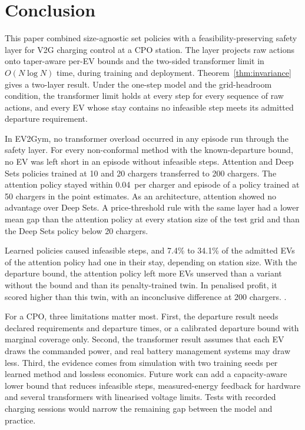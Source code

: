 \section{Conclusion}\label{sec:conclusion}

This paper combined size-agnostic set policies with a feasibility-preserving safety layer for V2G charging control at a CPO station.
The layer projects raw actions onto taper-aware per-EV bounds and the two-sided transformer limit in $O(N\log N)$ time, during training and deployment.
Theorem~\ref{thm:invariance} gives a two-layer result.
Under the one-step model and the grid-headroom condition, the transformer limit holds at every step for every sequence of raw actions, and every EV whose stay contains no infeasible step meets its admitted departure requirement.

In EV2Gym, no transformer overload occurred in any episode run through the safety layer.
For every non-conformal method with the known-departure bound, no EV was left short in an episode without infeasible steps.
Attention and Deep Sets policies trained at 10 and 20 chargers transferred to 200 chargers.
The attention policy stayed within 0.04\,\texteuro{} per charger and episode of a policy trained at 50 chargers in the point estimates.
As an architecture, attention showed no advantage over Deep Sets.
A price-threshold rule with the same layer had a lower mean gap than the attention policy at every station size of the test grid and than the Deep Sets policy below 20 chargers.

Learned policies caused infeasible steps, and 7.4\% to 34.1\% of the admitted EVs of the attention policy had one in their stay, depending on station size.
With the departure bound, the attention policy left more EVs unserved than a variant without the bound and than its penalty-trained twin.
In penalised profit, it scored higher than this twin, with an inconclusive difference at 200 chargers.
.

For a CPO, three limitations matter most.
First, the departure result needs declared requirements and departure times, or a calibrated departure bound with marginal coverage only.
Second, the transformer result assumes that each EV draws the commanded power, and real battery management systems may draw less.
Third, the evidence comes from simulation with two training seeds per learned method and lossless economics.
Future work can add a capacity-aware lower bound that reduces infeasible steps, measured-energy feedback for hardware and several transformers with linearised voltage limits.
Tests with recorded charging sessions would narrow the remaining gap between the model and practice.
